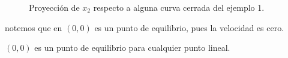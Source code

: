 \begin{ejemplo}
\begin{figure}[ht]
    \centering
    \caption{Proyección de $x_2$ respecto a alguna curva cerrada del ejemplo 1.}
    \label{fig:proyeccionx2}
\end{figure}


notemos que en $(0,0)$ es un punto de equilibrio, pues la velocidad es cero.

 \begin{tcolorbox}[colback=Black!4,colframe=White] 
\begin{nota}

  $(0,0)$ es un punto de equilibrio para cualquier punto lineal.
  
\end{nota}
\end{tcolorbox}

\end{ejemplo}

